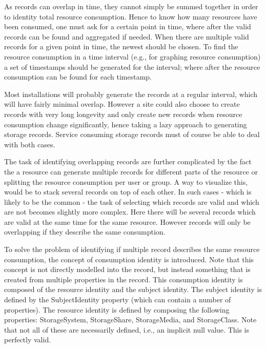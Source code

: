 As records can overlap in time, they cannot simply be summed together in order
to identity total resource consumption. Hence to know how many resources have
been consumed, one must ask for a certain point in time, where after the valid
records can be found and aggregated if needed. When there are multiple valid
records for a given point in time, the newest should be chosen. To find the
resource consumption in a time interval (e.g., for graphing resource
consumption) a set of timestamps should be generated for the interval; where
after the resource consumption can be found for each timestamp.

Most installations will probably generate the records at a regular interval,
which will have fairly minimal overlap. However a site could also choose to
create records with very long longevity and only create new records when
resource consumption change significantly, hence taking a lazy approach to
generating storage records. Service consuming storage records must of course be
able to deal with both cases.

The task of identifying overlapping records are further complicated by the fact
the a resource can generate multiple records for different parts of the
resource or splitting the resource consumption per user or group. A way to
visualize this, would be to stack several records on top of each other. In such
cases - which is likely to be the common - the task of selecting which records
are valid and which are not becomes slightly more complex. Here there will be
several records which are valid at the same time for the same resource. However
records will only be overlapping if they describe the same consumption.

To solve the problem of identifying if multiple record describes the same
resource consumption, the concept of consumption identity is introduced. Note
that this concept is not directly modelled into the record, but instead
something that is created from multiple properties in the record. This
consumption identity is composed of the resource identity and the subject
identity. The subject identity is defined by the SubjectIdentity property
(which can contain a number of properties). The resource identity is defined by
composing the following properties: StorageSystem, StorageShare, StorageMedia,
and StorageClass. Note that not all of these are necessarily defined, i.e., an
implicit null value. This is perfectly valid.


